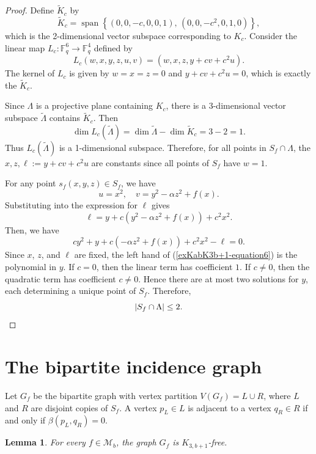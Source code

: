 \documentclass[11pt,a4paper]{article}
\newtheorem{lemma}[theorem]{Lemma}
\theoremstyle{definition}
\theoremstyle{remark}
\newcommand{\spanop}{\operatorname{span}}
\begin{document}
\begin{proof}
Define $\widetilde{K}_c$ by
$$
\widetilde{K}_c= \spanop\left\{ (0, 0, -c, 0, 0, 1), \, (0, 0, -c^2, 0, 1, 0) \right\},
$$
which is the 2-dimensional vector subspace corresponding to $K_c$.
Consider the linear map $L_c : \mathbb{F}_q^6 \to \mathbb{F}_q^4$ defined by
\[
L_c(w, x, y, z, u, v) = (w, x, z, y+cv+c^2u).
\]
The kernel of $L_c$ is given by $w = x = z = 0$ and $y + c v + c^2 u = 0$, which is exactly the $\widetilde{K}_c$.

Since $\Lambda$ is a projective plane containing $K_c$, there is a 3-dimensional vector subspace $\tilde{\Lambda}$ contains $\widetilde{K}_c$. Then
\[
\dim L_c(\tilde{\Lambda}) = \dim \tilde{\Lambda} - \dim \widetilde{K}_c = 3 - 2 = 1.
\]
Thus $L_c(\tilde{\Lambda})$ is a 1-dimensional subspace. Therefore, for all points in $S_f \cap \Lambda$, the
$
x, z, \ell := y + c v + c^2 u
$
are constants since all points of $S_f$ have $w = 1$.

For any point $s_f(x,y,z) \in S_f$, we have
\[
u = x^2, \quad v = y^2 - \alpha z^2 + f(x).
\]
Substituting into the expression for $\ell$ gives
\[
\ell = y + c(y^2 - \alpha z^2 + f(x)) + c^2 x^2.
\]
Then, we have
\begin{equation}\label{exKabK3b+1-equation6}
c y^2 + y + c(-\alpha z^2 + f(x)) + c^2 x^2 - \ell = 0.
\end{equation}
Since $x$, $z$, and $\ell$ are fixed,  the left hand of (\ref{exKabK3b+1-equation6}) is the polynomial in $y$. If $c = 0$, then the linear term has coefficient $1$. If $c \neq 0$, then the quadratic term has coefficient $c \neq 0$. Hence there are at most two solutions for $y$, each determining a unique point of $S_f$. Therefore,
\[
|S_f \cap \Lambda| \leq 2. \qedhere
\]
\end{proof}

\section{The bipartite incidence graph}
\label{sec:construction}



Let $G_f$ be the bipartite graph with vertex partition $V(G_f) = L \cup R$, where $L$ and $R$ are disjoint copies of $S_f$. A vertex $p_L \in L$ is adjacent to a vertex $q_R \in R$ if and only if $\beta(p_L, q_R) = 0$.

\begin{lemma} \label{lem:k3t-free}
For every $f \in \mathcal{M}_b$, the graph $G_f$ is $K_{3,b+1}$-free.
\end{lemma}
\end{document}
